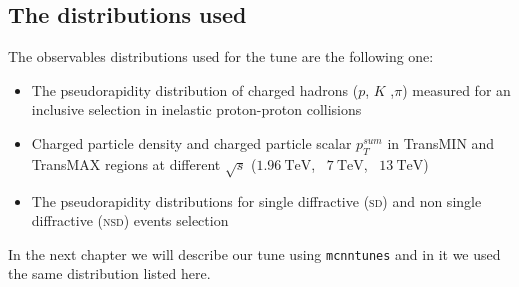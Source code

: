 \subsection{The distributions used}
\label{sec:Thedistributionsused}

The observables distributions used for the tune are the following one:


\begin{itemize}
	\item The pseudorapidity distribution of charged hadrons ($p$, $K$ ,$\pi$) measured for an
inclusive selection in inelastic proton-proton collisions
\item Charged particle density and charged particle scalar $p_T^{sum}$ in TransMIN and TransMAX regions at different $\sqrt{s}$ ($1.96\ \mathrm{TeV}$, \, $7\ \mathrm{TeV}$, \, $13\ \mathrm{TeV}$)
\item The pseudorapidity distributions for single diffractive (\textsc{sd}) and non single diffractive (\textsc{nsd}) events selection
\end{itemize}
In the next chapter we will describe our tune using \texttt{mcnntunes} and in it we used the same distribution listed here.

